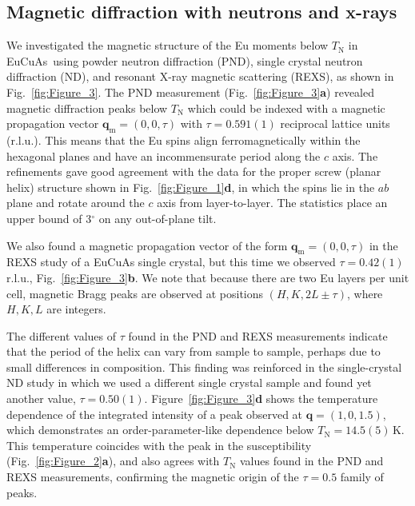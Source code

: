 \documentclass[aps,prl,amsmath,amssymb,amstext,citeautoscript,punctuation,nofootinbib,superscriptaddress,twocolumn]{revtex4-1}
\newcommand{\eca}{EuCuAs}
\begin{document}
\subsection{Magnetic diffraction with  neutrons and x-rays}

We investigated the magnetic structure of the Eu moments below $T_\mathrm{N}$ in \eca\ using powder neutron diffraction (PND), single crystal neutron diffraction (ND), and resonant X-ray magnetic scattering (REXS), as shown in Fig.~\ref{fig:Figure_3}. The PND measurement (Fig.~\ref{fig:Figure_3}\textbf{a}) revealed magnetic diffraction peaks below $T_\mathrm{N}$  which could be indexed with a magnetic propagation vector $\textbf{q}_\textrm{m} = (0, 0, \tau)$ with $\tau = 0.591(1)$ reciprocal lattice units (r.l.u.). This means that the Eu spins align ferromagnetically within the hexagonal planes and have an incommensurate period along the $c$ axis. The refinements gave good agreement with the data for the  proper screw (planar helix) structure shown in Fig.~\ref{fig:Figure_1}\textbf{d}, in which the spins lie in the $ab$ plane and rotate around the $c$ axis from layer-to-layer.  The statistics place an upper bound of 3$^\circ$ on any out-of-plane tilt. 

We also found a magnetic propagation vector of the form $\textbf{q}_\textrm{m} = (0, 0, \tau)$ in the REXS study of a EuCuAs single crystal, but this time we observed $\tau = 0.42(1)$\,r.l.u., Fig.~\ref{fig:Figure_3}\textbf{b}. We note that because there are two Eu layers per unit cell, magnetic Bragg peaks are observed at positions $(H,K,2L\pm \tau)$, where $H, K, L$ are integers.

The different values of $\tau$ found in the PND and REXS measurements indicate that the period of the helix can vary from sample to sample, perhaps due to small differences in composition. This finding was reinforced in the single-crystal ND study in which we used a different single crystal sample and found yet another value, $\tau=0.50(1)$. Figure~\ref{fig:Figure_3}\textbf{d} shows the temperature dependence of the integrated intensity of a peak observed at $\textbf{q} = (1,0,1.5)$, which demonstrates an order-parameter-like dependence below $T_\mathrm{N} = 14.5(5)$\,K. This temperature coincides with the peak in the susceptibility (Fig.~\ref{fig:Figure_2}\textbf{a}), and also agrees with  $T_\mathrm{N}$ values found in the PND and REXS measurements, confirming the magnetic origin of the $\tau = 0.5$ family of peaks.
\end{document}
